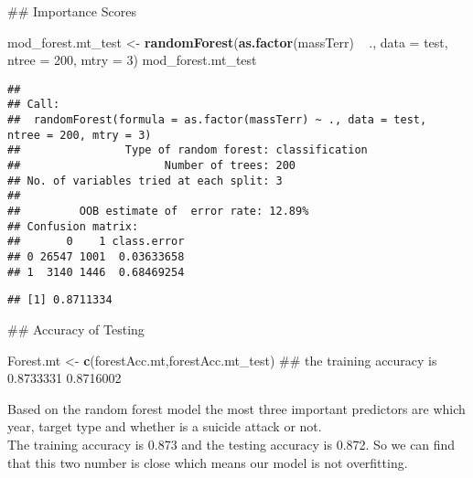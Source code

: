 \documentclass[11pt,letterpaper,]{article}
\newenvironment{Shaded}{\begin{snugshade}}{\end{snugshade}}
\newcommand{\KeywordTok}[1]{\textcolor[rgb]{0.13,0.29,0.53}{\textbf{{#1}}}}
\newcommand{\DataTypeTok}[1]{\textcolor[rgb]{0.13,0.29,0.53}{{#1}}}
\newcommand{\DecValTok}[1]{\textcolor[rgb]{0.00,0.00,0.81}{{#1}}}
\newcommand{\StringTok}[1]{\textcolor[rgb]{0.31,0.60,0.02}{{#1}}}
\newcommand{\NormalTok}[1]{{#1}}
\theoremstyle{definition}
\theoremstyle{definition}
\theoremstyle{definition}
\theoremstyle{remark}
\begin{document}
\begin{Shaded}
\begin{Highlighting}[]
\NormalTok{## Importance Scores}



\NormalTok{mod_forest.mt_test <-}\StringTok{ }\KeywordTok{randomForest}\NormalTok{(}\KeywordTok{as.factor}\NormalTok{(massTerr) ~}\StringTok{ }\NormalTok{., }\DataTypeTok{data =} \NormalTok{test, }\DataTypeTok{ntree =} \DecValTok{200}\NormalTok{, }\DataTypeTok{mtry =} \DecValTok{3}\NormalTok{)}
\NormalTok{mod_forest.mt_test}
\end{Highlighting}
\end{Shaded}

\begin{verbatim}
## 
## Call:
##  randomForest(formula = as.factor(massTerr) ~ ., data = test,      ntree = 200, mtry = 3) 
##                Type of random forest: classification
##                      Number of trees: 200
## No. of variables tried at each split: 3
## 
##         OOB estimate of  error rate: 12.89%
## Confusion matrix:
##       0    1 class.error
## 0 26547 1001  0.03633658
## 1  3140 1446  0.68469254
\end{verbatim}

\begin{Shaded}
\end{Shaded}

\begin{verbatim}
## [1] 0.8711334
\end{verbatim}

\begin{Shaded}
\begin{Highlighting}[]
\NormalTok{## Accuracy of Testing}

\NormalTok{Forest.mt <-}\StringTok{ }\KeywordTok{c}\NormalTok{(forestAcc.mt,forestAcc.mt_test)}
\NormalTok{## the training accuracy is 0.8733331 0.8716002}
\end{Highlighting}
\end{Shaded}

Based on the random forest model the most three important predictors are
which year, target type and whether is a suicide attack or not.\\
The training accuracy is 0.873 and the testing accuracy is 0.872. So we
can find that this two number is close which means our model is not
overfitting.
\end{document}
